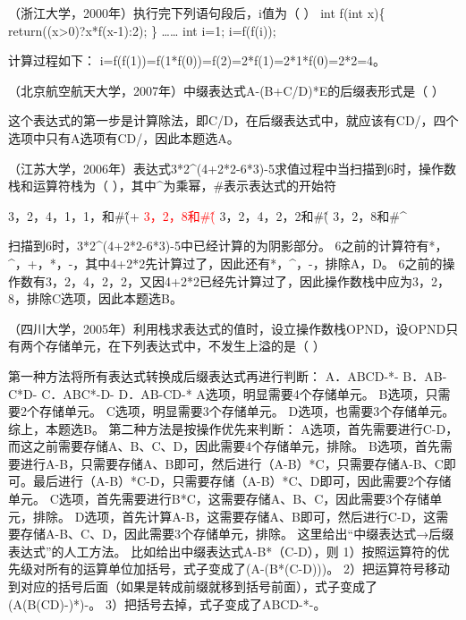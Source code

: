 \question （浙江大学，2000年）执行完下列语句段后，i值为（ ） int f(int x)\{
return((x\textgreater{}0)?x*f(x-1):2); \} \ldots{}\ldots{} int i=1;
i=f(f(i));
\par{}
\begin{solution}计算过程如下： i=f(f(1))=f(1*f(0))=f(2)=2*f(1)=2*1*f(0)=2*2=4。
\end{solution}
\question （北京航空航天大学，2007年）中缀表达式A-(B+C/D)*E的后缀表形式是（ ）
\par{}
\begin{solution}这个表达式的第一步是计算除法，即C/D，在后缀表达式中，就应该有CD/，四个选项中只有A选项有CD/，因此本题选A。
\end{solution}
\question （江苏大学，2006年）表达式3*2\^{}(4+2*2-6*3)-5求值过程中当扫描到6时，操作数栈和运算符栈为（
），其中\^{}为乘幂，\#表示表达式的开始符
\par\fourch
{3，2，4，1，1，和\#\*\^(+\*\-}
{\textcolor{red}{3，2，8和\#\*\^(\-}}
{3，2，4，2，2和\#\*\^(\-}
{3，2，8和\#\*\^\-}
\begin{solution}扫描到6时，3*2\^{}(4+2*2-6*3)-5中已经计算的为阴影部分。
6之前的计算符有*，\^{}，+，*，-，其中4+2*2先计算过了，因此还有*，\^{}，-，排除A，D。
6之前的操作数有3，2，4，2，2，又因4+2*2已经先计算过了，因此操作数栈中应为3，2，8，排除C选项，因此本题选B。
\end{solution}
\question （四川大学，2005年）利用栈求表达式的值时，设立操作数栈OPND，设OPND只有两个存储单元，在下列表达式中，不发生上溢的是（
）
\par{}
\begin{solution}第一种方法将所有表达式转换成后缀表达式再进行判断： A．ABCD-*- B．AB-C*D-
C．ABC*-D- D．AB-CD-* A选项，明显需要4个存储单元。
B选项，只需要2个存储单元。 C选项，明显需要3个存储单元。
D选项，也需要3个存储单元。 综上，本题选B。
第二种方法是按操作优先来判断：
A选项，首先需要进行C-D，而这之前需要存储A、B、C、D，因此需要4个存储单元，排除。
B选项，首先需要进行A-B，只需要存储A、B即可，然后进行（A-B）*C，只需要存储A-B、C即可。最后进行（A-B）*C-D，只需要存储（A-B）*C、D即可，因此需要2个存储单元。
C选项，首先需要进行B*C，这需要存储A、B、C，因此需要3个存储单元，排除。
D选项，首先计算A-B，这需要存储A、B即可，然后进行C-D，这需要存储A-B、C、D，因此需要3个存储单元，排除。
这里给出``中缀表达式→后缀表达式''的人工方法。
比如给出中缀表达式A-B*（C-D），则
1）按照运算符的优先级对所有的运算单位加括号，式子变成了(A-(B*(C-D)))。
2）把运算符号移动到对应的括号后面（如果是转成前缀就移到括号前面），式子变成了(A(B(CD)-)*)-。
3）把括号去掉，式子变成了ABCD-*-。
\end{solution}
